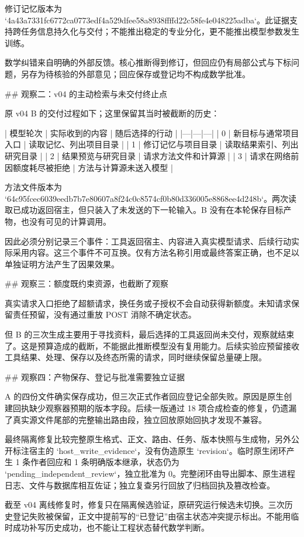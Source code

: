 修订记忆版本为 `4a43a7331fc6772ca0773edf4a529dfee58a8938ffffd22c58fe4e048225adba`。此证据支持跨任务信息持久化与交付；不能推出稳定的专业分化，更不能推出模型参数发生训练。

数学纠错来自明确的外部反馈。核心推断得到修订，但回应仍有局部公式与下标问题，另存为待核验的外部意见；回应保存或登记均不构成数学批准。

## 观察二：v04 的主动检索与未交付终止点

原 v04 B 的交付过程如下；这里保留其当时被截断的历史：

| 模型轮次 | 实际收到的内容 | 随后选择的行动 |
|---|---|---|
| 0 | 新目标与通常项目入口 | 读取记忆、列出项目目录 |
| 1 | 修订记忆与项目目录 | 读取结果索引、列出研究目录 |
| 2 | 结果预览与研究目录 | 请求方法文件和计算源 |
| 3 | 请求在网络前因额度耗尽被拒绝 | 方法与计算源未送入模型 |

方法文件版本为 `64c95fcec6039eedb7b7e80607a8f24c0c8574cf0b80d336005e8868ee4d248b`。两次读取已成功返回宿主，但只装入了未发送的下一轮输入。B 没有在本轮保存目标产物，也没有可见的计算调用。

因此必须分别记录三个事件：工具返回宿主、内容进入真实模型请求、后续行动实际采用内容。这三个事件不可互换。仅有方法名称引用或最终答案正确，也不足以单独证明方法产生了因果效果。

## 观察三：额度既约束资源，也截断了观察

真实请求入口拒绝了超额请求，换任务或子授权不会自动获得新额度。未知请求保留责任预留，没有通过重放 POST 消除不确定状态。

但 B 的三次生成主要用于寻找资料，最后选择的工具返回尚未交付，观察就结束了。这是预算造成的截断，不能据此推断模型没有复用能力。后续实验应预留接收工具结果、处理、保存以及终态所需的请求，同时继续保留总量硬上限。

## 观察四：产物保存、登记与批准需要独立证据

A 的四份文件确实保存成功，但三次正式作者回应登记全部失败。原因是原生创建回执缺少观察器预期的版本字段。后续一版通过 18 项合成检查的修复，仍遗漏了真实源文件尾部的完整输出路由段，独立回放原始回执才发现不兼容。

最终隔离修复比较完整原生格式、正文、路由、任务、版本快照与生成物，另外公开标注宿主的 `host_write_evidence`，没有伪造原生 `revision`。临时原生闭环产生 1 条作者回应和 1 条明确版本继承，状态仍为 `pending_independent_review`，独立批准为 0。完整闭环由导出脚本、原生进程日志、文件与数据库相互佐证；独立复查另行回放了归档回执及篡改检查。

截至 v04 离线修复时，修复只在隔离候选验证，原研究运行候选未切换。三次历史登记失败被保留，正文中提前写的“已登记”由宿主状态冲突提示标出。不能用临时成功补写历史成功，也不能让工程状态替代数学判断。

